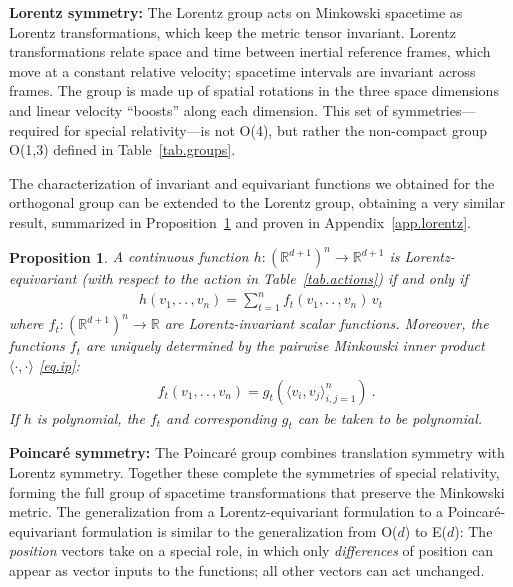 \documentclass{article}
\renewcommand{\paragraph}[1]{\par\textbf{#1}}
\theoremstyle{Hogg}
\newtheorem{proposition}[theorem]{Proposition}
\newcommand{\inner}[2]{\langle{#1},{#2}\rangle}
\renewcommand{\ldots}{.\,.\,}
\begin{document}
\paragraph{Lorentz symmetry:}
The Lorentz group acts on Minkowski spacetime as Lorentz transformations, which keep the metric tensor invariant.
Lorentz transformations relate space and time between inertial reference frames, which move at a constant relative velocity; spacetime intervals are invariant across frames.
The group is made up of spatial rotations in the three space dimensions and linear velocity ``boosts'' along each dimension.
This set of symmetries---required for special relativity---is not O(4), but rather the non-compact group O(1,3) defined in Table~\ref{tab.groups}.

The characterization of invariant and equivariant functions we obtained for the orthogonal group can be extended to the Lorentz group, obtaining a very similar result, summarized in Proposition~\ref{prop.lorentz} and proven in Appendix~\ref{app.lorentz}.

\begin{proposition} \label{prop.lorentz}
A continuous function $h:(\mathbb R^{d+1})^n \to \mathbb R^{d+1}$ is Lorentz-equivariant (with respect to the action in Table~\ref{tab.actions}) if and only if 
\begin{align}
    h(v_1,\ldots,v_n) = \textstyle\sum_{t=1}^n f_t(v_1, \ldots, v_n)\,v_t
\end{align}
where $f_t:(\mathbb R^{d+1})^n \to \mathbb R$ are Lorentz-invariant scalar functions. Moreover, the functions $f_t$ are uniquely determined by the pairwise Minkowski inner product $\inner{\cdot}{\cdot}$ \eqref{eq.ip}:
\begin{align}
    &f_t(v_1,\ldots, v_n)=g_t( \inner{v_i}{v_j}_{i,j=1}^n ) \label{eq.f}
    ~.
\end{align}
If $h$ is polynomial, the $f_t$ and corresponding $g_t$ can be taken to be polynomial.
\end{proposition}

\paragraph{Poincar\'e symmetry:}
The Poincar\'e group combines translation symmetry with Lorentz symmetry.
Together these complete the symmetries of special relativity, forming the full group of spacetime transformations that preserve the Minkowski metric. 
The generalization from a Lorentz-equivariant formulation to a Poincar\'e-equivariant formulation is similar to the generalization from O($d$) to E($d$):
The \emph{position} vectors take on a special role, in which only \emph{differences} of position can appear as vector inputs to the functions; all other vectors can act unchanged.
\end{document}
